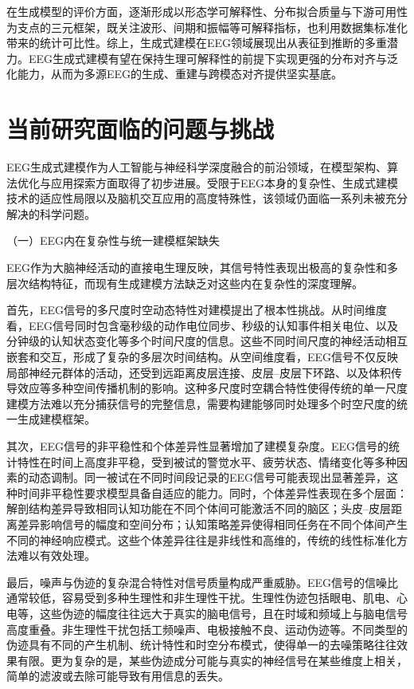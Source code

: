 在生成模型的评价方面，逐渐形成以形态学可解释性、分布拟合质量与下游可用性为支点的三元框架，既关注波形、间期和振幅等可解释指标，也利用数据集标准化带来的统计可比性\cite{moody2001impact}。综上，生成式建模在EEG领域展现出从表征到推断的多重潜力。EEG生成式建模有望在保持生理可解释性的前提下实现更强的分布对齐与泛化能力，从而为多源EEG的生成、重建与跨模态对齐提供坚实基底。

\section{当前研究面临的问题与挑战}
EEG生成式建模作为人工智能与神经科学深度融合的前沿领域，在模型架构、算法优化与应用探索方面取得了初步进展。受限于EEG本身的复杂性、生成式建模技术的适应性局限以及脑机交互应用的高度特殊性，该领域仍面临一系列未被充分解决的科学问题。

（一）EEG内在复杂性与统一建模框架缺失

EEG作为大脑神经活动的直接电生理反映，其信号特性表现出极高的复杂性和多层次结构特征，而现有生成建模方法缺乏对这些内在复杂性的深度理解。

首先，EEG信号的多尺度时空动态特性对建模提出了根本性挑战。从时间维度看，EEG信号同时包含毫秒级的动作电位同步、秒级的认知事件相关电位、以及分钟级的认知状态变化等多个时间尺度的信息。这些不同时间尺度的神经活动相互嵌套和交互，形成了复杂的多层次时间结构。从空间维度看，EEG信号不仅反映局部神经元群体的活动，还受到远距离皮层连接、皮层--皮层下环路、以及体积传导效应等多种空间传播机制的影响。这种多尺度时空耦合特性使得传统的单一尺度建模方法难以充分捕获信号的完整信息，需要构建能够同时处理多个时空尺度的统一生成建模框架。

其次，EEG信号的非平稳性和个体差异性显著增加了建模复杂度。EEG信号的统计特性在时间上高度非平稳，受到被试的警觉水平、疲劳状态、情绪变化等多种因素的动态调制。同一被试在不同时间段记录的EEG信号可能表现出显著差异，这种时间非平稳性要求模型具备自适应的能力。同时，个体差异性表现在多个层面：解剖结构差异导致相同认知功能在不同个体间可能激活不同的脑区；头皮--皮层距离差异影响信号的幅度和空间分布；认知策略差异使得相同任务在不同个体间产生不同的神经响应模式。这些个体差异往往是非线性和高维的，传统的线性标准化方法难以有效处理。

最后，噪声与伪迹的复杂混合特性对信号质量构成严重威胁。EEG信号的信噪比通常较低，容易受到多种生理性和非生理性干扰。生理性伪迹包括眼电、肌电、心电等，这些伪迹的幅度往往远大于真实的脑电信号，且在时域和频域上与脑电信号高度重叠。非生理性干扰包括工频噪声、电极接触不良、运动伪迹等。不同类型的伪迹具有不同的产生机制、统计特性和时空分布模式，使得单一的去噪策略往往效果有限。更为复杂的是，某些伪迹成分可能与真实的神经信号在某些维度上相关，简单的滤波或去除可能导致有用信息的丢失。

